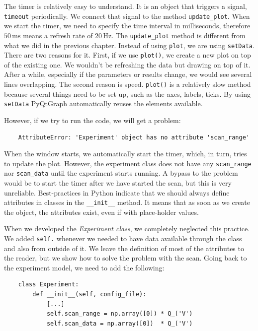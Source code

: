 The timer is relatively easy to understand. It is an object that triggers a signal, \texttt{timeout} periodically. We connect that signal to the method \texttt{update\_plot}. When we start the timer, we need to specify the time interval in milliseconds, therefore $50\,\textrm{ms}$ means a refresh rate of $20\,\textrm{Hz}$. The \texttt{update\_plot} method is different from what we did in the previous chapter. Instead of using \texttt{plot}, we are using \texttt{setData}. There are two reasons for it. First, if we use \texttt{plot()}, we create a new plot on top of the existing one. We wouldn't be refreshing the data but drawing on top of it. After a while, especially if the parameters or results change, we would see several lines overlapping. The second reason is speed. \texttt{plot()} is a relatively slow method because several things need to be set up, such as the axes, labels, ticks. By using \texttt{setData} PyQtGraph automatically reuses the elements available.

However, if we try to run the code, we will get a problem:

\begin{verbatim}
    AttributeError: 'Experiment' object has no attribute 'scan_range'
\end{verbatim}


When the window starts, we automatically start the timer, which, in turn, tries to update the plot. However, the experiment class does not have any \texttt{scan\_range} nor \texttt{scan\_data} until the experiment starts running. A bypass to the problem would be to start the timer after we have started the scan, but this is very unreliable. Best-practices in Python indicate that we should always define attributes in classes in the \texttt{\_\_init\_\_} method. It means that as soon as we create the object, the attributes exist, even if with place-holder values.

When we developed the \emph{Experiment class}, we completely neglected this practice. We added \texttt{self.} whenever we needed to have data available through the class and also from outside of it. We leave the definition of most of the attributes to the reader, but we show how to solve the problem with the scan. Going back to the experiment model, we need to add the following:

\begin{verbatim}
    class Experiment:
        def __init__(self, config_file):
            [...]
            self.scan_range = np.array([0]) * Q_('V')
            self.scan_data = np.array([0])  * Q_('V')
\end{verbatim}


